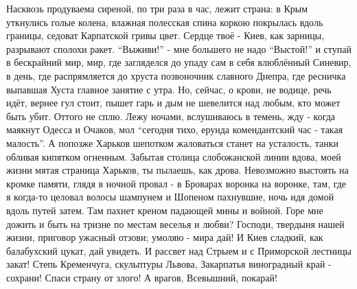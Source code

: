 \raggedcolumns
\begin{multicols}{2} %
\setlength{\parindent}{0pt}

\obeycr
Насквозь продуваема сиреной,
по три раза в час, лежит страна:
в Крым уткнулись голые колена,
влажная полесская спина
коркою покрылась вдоль границы,
седоват Карпатской гривы цвет.
\smallskip
Сердце твоё - Киев, как зарницы,
разрывают сполохи ракет.
\enquote{Выживи!} - мне большего не надо
\enquote{Выстой!} и ступай в бескрайний мир,
\smallskip
мир, где загляделся до упаду
сам в себя влюблённый Синевир,
в день, где распрямляется до хруста
позвоночник славного Днепра,
где ресничка выпавшая Хуста
главное занятие с утра.
\smallskip
Но, сейчас, о крови, не водице,
речь идёт, вернее гул стоит,
пышет гарь и дым не шевелится
над любым, кто может быть убит.
\smallskip
Оттого не сплю. Лежу ночами,
вслушиваюсь в темень, жду - когда
маякнут Одесса и Очаков,
мол \enquote{сегодня тихо, ерунда
комендантский час - такая малость}.
\smallskip
А попозже Харьков шепотком
жаловаться станет на усталость,
танки обливая кипятком
огненным. Забытая столица
слобожанской линии вдова,
моей жизни мятая страница
Харьков, ты пылаешь, как дрова.
\smallskip
Невозможно выстоять на кромке
памяти, глядя в ночной провал -
в Броварах воронка на воронке,
там, где я когда-то целовал
волосы шампунем и Шопеном
пахнувшие, ночь идя домой
вдоль путей затем. Там пахнет креном
падающей мины и войной.
\smallskip
Горе мне дожить и быть на тризне
по местам веселья и любви?
Господи, твердыня нашей жизни,
приговор ужасный отзови;
\smallskip
умоляю - мира дай! И Киев
сладкий, как балабухский цукат,
дай увидеть. И рассвет над Стрыем
и с Приморской лестницы закат!
\smallskip
Степь Кременчуга, скульптуры Львова,
Закарпатья виноградный край -
сохрани! Спаси страну от злого!
А врагов, Всевышний, покарай!
\restorecr

\end{multicols} %

